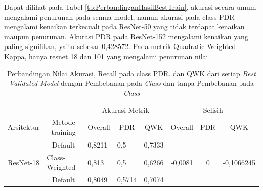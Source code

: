 Dapat dilihat pada Tabel \ref{tb:PerbandinganHasilBestTrain}, akurasi secara umum mengalami penurunan pada semua model, namun akurasi pada class PDR mengalami kenaikan terkecuali pada ResNet-50 yang tidak terdapat kenaikan maupun penurunan. Akurasi PDR pada ResNet-152 mengalami kenaikan yang paling signifikan, yaitu sebesar 0,428572. Pada metrik Quadratic Weighted Kappa, hanya resnet 18 dan 101 yang mengalami penurunan nilai.
\begin{table}[hbtp]
	\begin{center}
	\caption{Perbandingan Nilai Akurasi, Recall pada class PDR. dan QWK dari setiap \emph{Best Validated Model} dengan Pembebanan pada \emph{Class} dan tanpa Pembebanan pada \emph{Class}}
	\label{tb:PerbandinganHasilBestVal}
	\begin{tabular}{|c|c|lll|ccc|}
		\hline
		\cellcolor[HTML]{C0C0C0}                             & \cellcolor[HTML]{C0C0C0}                                  & \multicolumn{3}{c|}{\cellcolor[HTML]{C0C0C0}Akurasi Metrik}                           & \multicolumn{3}{c|}{\cellcolor[HTML]{C0C0C0}Selisih}                                                                            \\ \cline{3-8} 
		\multirow{-2}{*}{\cellcolor[HTML]{C0C0C0}Arsitektur} & \multirow{-2}{*}{\cellcolor[HTML]{C0C0C0}Metode training} & \multicolumn{1}{c|}{Overall} & \multicolumn{1}{c|}{PDR}    & \multicolumn{1}{c|}{QWK} & \multicolumn{1}{c|}{Overall}                   & \multicolumn{1}{c|}{PDR}                        & QWK                          \\ \hline
															 & Default                                                   & \multicolumn{1}{l|}{0,8211}  & \multicolumn{1}{l|}{0,5}    & 0,7333                   & \multicolumn{1}{c|}{}                          & \multicolumn{1}{c|}{}                           &                              \\ \cline{2-5}
		\multirow{-2}{*}{ResNet-18}                          & \multicolumn{1}{l|}{Class-Weighted}                       & \multicolumn{1}{l|}{0,813}   & \multicolumn{1}{l|}{0,5}    & 0,6266                   & \multicolumn{1}{c|}{\multirow{-2}{*}{-0,0081}} & \multicolumn{1}{c|}{\multirow{-2}{*}{0}}        & \multirow{-2}{*}{-0,1066245} \\ \hline
															 & Default                                                   & \multicolumn{1}{l|}{0,8049}  & \multicolumn{1}{l|}{0,5714} & 0,7074                   & \multicolumn{1}{c|}{}                          & \multicolumn{1}{c|}{}                           &                              \\ \cline{2-5}

\end{tabular}
\end{center}
\end{table}
